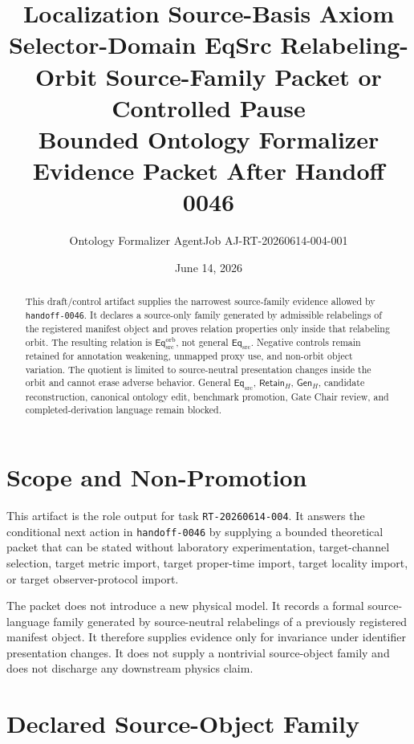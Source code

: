 \documentclass[11pt]{article}
\title{\textbf{Localization Source-Basis Axiom Selector-Domain EqSrc Relabeling-Orbit Source-Family Packet or Controlled Pause}\\[0.35em]
\large Bounded Ontology Formalizer Evidence Packet After Handoff 0046}
\author{Ontology Formalizer AgentJob AJ-RT-20260614-004-001}
\date{June 14, 2026}
\newcommand{\EqSrc}{\mathsf{Eq}_{\mathrm{src}}}
\newcommand{\EqOrb}{\mathsf{Eq}_{\mathrm{src}}^{\mathrm{orb}}}
\newcommand{\GenH}{\mathsf{Gen}_{H}}
\newcommand{\RetainH}{\mathsf{Retain}_{H}}
\begin{document}
\maketitle

\begin{abstract}
This draft/control artifact supplies the narrowest source-family evidence
allowed by \texttt{handoff-0046}. It declares a source-only family generated
by admissible relabelings of the registered manifest object and proves
relation properties only inside that relabeling orbit. The resulting
relation is \(\EqOrb\), not general \(\EqSrc\). Negative controls remain
retained for annotation weakening, unmapped proxy use, and non-orbit object
variation. The quotient is limited to source-neutral presentation changes
inside the orbit and cannot erase adverse behavior. General \(\EqSrc\),
\(\RetainH\), \(\GenH\), candidate reconstruction, canonical ontology edit,
benchmark promotion, Gate Chair review, and completed-derivation language
remain blocked.
\end{abstract}

\section{Scope and Non-Promotion}

This artifact is the role output for task \texttt{RT-20260614-004}. It
answers the conditional next action in \texttt{handoff-0046} by supplying a
bounded theoretical packet that can be stated without laboratory
experimentation, target-channel selection, target metric import, target
proper-time import, target locality import, or target observer-protocol
import.

The packet does not introduce a new physical model. It records a formal
source-language family generated by source-neutral relabelings of a
previously registered manifest object. It therefore supplies evidence only
for invariance under identifier presentation changes. It does not supply a
nontrivial source-object family and does not discharge any downstream
physics claim.

\section{Declared Source-Object Family}
\end{document}
